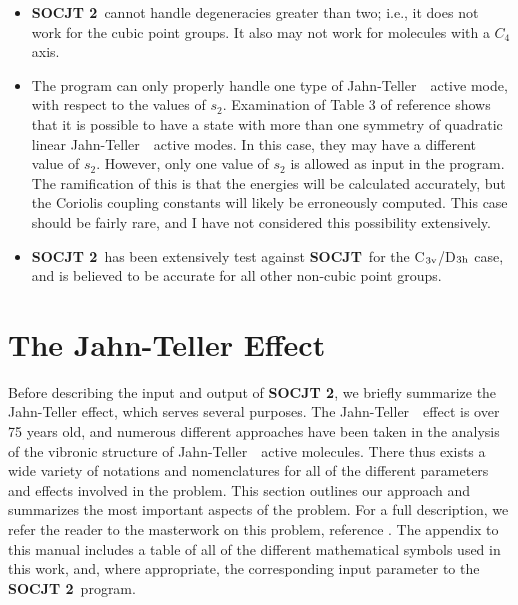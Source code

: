 \documentclass{article}
\newcommand{\JT}{Jahn-Teller\ }
\newcommand{\socjttwo}{{\bf SOCJT 2}}
\newcommand{\socjt}{{\bf SOCJT}}
\newenvironment{bulletlist}{%
  \renewcommand{\labelitemi}{$\bullet $}%
     \begin{itemize}}{\end{itemize}}
\begin{document}
\begin{bulletlist}
\item \socjttwo\ cannot handle degeneracies greater than two; i.e., it
  does not work for the cubic point groups. It also may not
  work for molecules with a $C_4$ axis. %
\item The program can only properly handle one type of \JT\ active
  mode, with respect to the values of $s_2$. Examination of
  Table 3 of reference  shows that it is possible to have
  a state with more than one symmetry of quadratic linear \JT\ active
  modes. In this case, they may have a different value of
  $s_2$. However, only one value of $s_2$ is allowed as input in the
  program. The ramification of this is that the energies will be
  calculated accurately, but the Coriolis coupling constants will
  likely be erroneously computed. This case should be fairly rare, and
  I have not considered this possibility extensively.
\item \socjttwo\ has been extensively test against \socjt\ for the C$_{3\textnormal{v}}$/D$_{3\textnormal{h}}$ case, and
  is believed to be accurate for all other non-cubic point groups.
\end{bulletlist}

\section{The Jahn-Teller Effect} \label{section:jt}

Before describing the input and output of \socjttwo, we briefly summarize
the Jahn-Teller effect, which serves several purposes. The \JT\ effect
is over 75 years old, and numerous different approaches have been
taken in the analysis of the vibronic structure of \JT\ active
molecules. There thus exists a wide variety of notations and
nomenclatures for all of the different parameters and effects involved
in the problem. This section outlines our approach and summarizes the
most important aspects of the problem. For a full description, we
refer the reader to the masterwork on this problem, reference
. The appendix to this manual includes a table of all of
the different mathematical symbols used in this work, and, where 
appropriate, the corresponding input parameter to the \socjttwo\ program.
\end{document}
